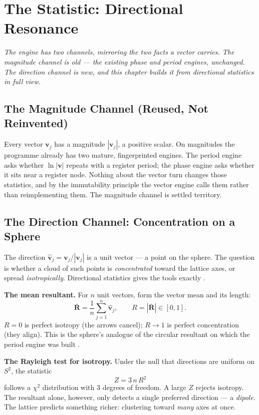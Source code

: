 \documentclass[11pt, letterpaper, openany]{book}
\newcommand{\uvec}[1]{\hat{\mathbf{#1}}}
\newcommand{\Rbar}{\bar{\mathbf{R}}}
\begin{document}
\chapter{The Statistic: Directional Resonance}

\begin{center}
\textit{The engine has two channels, mirroring the two facts a vector carries. The magnitude channel is
old --- the existing phase and period engines, unchanged. The direction channel is new, and this chapter
builds it from directional statistics in full view.}
\end{center}

\section{The Magnitude Channel (Reused, Not Reinvented)}

Every vector $\mathbf{v}_j$ has a magnitude $|\mathbf{v}_j|$, a positive scalar. On magnitudes the
programme already has two mature, fingerprinted engines. The period engine asks whether $\ln|\mathbf{v}|$
repeats with a register period; the phase engine asks whether it sits near a register node. Nothing about
the vector turn changes those statistics, and by the immutability principle the vector engine calls them
rather than reimplementing them. The magnitude channel is settled territory.

\section{The Direction Channel: Concentration on a Sphere}

The direction $\uvec{v}_j = \mathbf{v}_j / |\mathbf{v}_j|$ is a unit vector --- a point on the sphere.
The question is whether a cloud of such points is \emph{concentrated} toward the lattice axes, or spread
\emph{isotropically}. Directional statistics gives the tools exactly \cite{mardia2000, fisher1993}.

\begin{derivbox}
\textbf{The mean resultant.} For $n$ unit vectors, form the vector mean and its length:
\[
\Rbar = \frac{1}{n}\sum_{j=1}^{n}\uvec{v}_j, \qquad R = |\Rbar| \in [0,1].
\]
$R = 0$ is perfect isotropy (the arrows cancel); $R \to 1$ is perfect concentration (they align). This
is the sphere's analogue of the circular resultant on which the period engine was built
\cite{rayleigh1880}.

\textbf{The Rayleigh test for isotropy.} Under the null that directions are uniform on $S^2$, the
statistic
\[
Z = 3\,n\,R^2
\]
follows a $\chi^2$ distribution with $3$ degrees of freedom. A large $Z$ rejects isotropy. The resultant
alone, however, only detects a single preferred direction --- a \emph{dipole}. The lattice predicts
something richer: clustering toward \emph{many} axes at once.
\end{derivbox}
\end{document}
